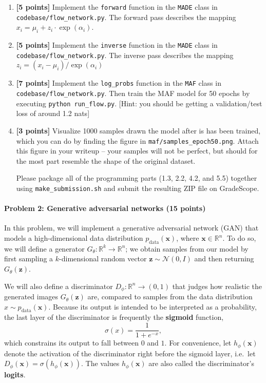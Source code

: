 \documentclass{article}
\newcommand{\bx}{{\boldsymbol{x}}}
\newcommand{\bz}{{\boldsymbol{z}}}
\begin{document}
\begin{enumerate}
    \item \textbf{[5 points]} Implement the \texttt{forward} function in the \texttt{MADE} class in \texttt{codebase/flow\_network.py}. The forward pass describes the mapping $x_i = \mu_i + z_i \cdot \exp(\alpha_i)$.
    
    \item \textbf{[5 points]} Implement the \texttt{inverse} function in the \texttt{MADE} class in \texttt{codebase/flow\_network.py}. The inverse pass describes the mapping $z_i = (x_i - \mu_i)/\exp(\alpha_i)$
    
    \item \textbf{[7 points]} Implement the \texttt{log\_probs} function in the \texttt{MAF} class in \texttt{codebase/flow\_network.py}. Then train the MAF model for 50 epochs by executing \texttt{python run\_flow.py}. [Hint: you should be getting a validation/test loss of around 1.2 nats]

    \item \textbf{[3 points]} Visualize 1000 samples drawn the model after is has been trained, which you can do by finding the figure in \texttt{maf/samples\_epoch50.png}. Attach this figure in your writeup -- your samples will not be perfect, but should for the most part resemble the shape of the original dataset.
    
    Please package all of the programming parts (1.3, 2.2, 4.2, and 5.5) together using \texttt{make\_submission.sh} and submit the resulting ZIP file on GradeScope.
\end{enumerate}

\paragraph{Problem 2: Generative adversarial networks (15 points) \\}

In this problem, we will implement a generative adversarial network (GAN) that models a high-dimensional data distribution $p_\text{data}(\bx)$, where $\bx \in \mathbb{R}^n$. To do so, we will define a generator $G_\theta : \mathbb {R}^k \to \mathbb{R}^n$; we obtain samples from our model by first sampling a $k$-dimensional random vector $\bz \sim \mathcal{N}(0, I)$ and then returning $G_\theta(\bz)$. 

We will also define a discriminator $D_\phi : \mathbb{R}^n \to (0,1)$ that judges how realistic the generated images $G_\theta(\bz)$ are, compared to samples from the data distribution ${x} \sim p_\text{data}(\bx)$. Because its output is intended to be interpreted as a probability, the last layer of the discriminator is frequently the \textbf{sigmoid} function, \[
\sigma(x) = \frac{1}{1 + e^{-x}},\]which constrains its output to fall between $0$ and $1$. For convenience, let $h_\phi(\bx)$ denote the activation of the discriminator right before the sigmoid layer, i.e.~let $D_\phi(\bx) = \sigma(h_\phi(\bx))$. The values $h_\phi(\bx)$ are also called the discriminator's \textbf{logits}.
\end{document}
